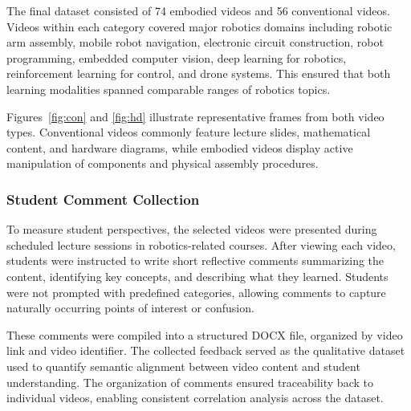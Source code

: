 The final dataset consisted of 74 embodied videos and 56 conventional videos. Videos within each category covered major robotics domains including robotic arm assembly, mobile robot navigation, electronic circuit construction, robot programming, embedded computer vision, deep learning for robotics, reinforcement learning for control, and drone systems. This ensured that both learning modalities spanned comparable ranges of robotics topics.

Figures~\ref{fig:con} and \ref{fig:hd} illustrate representative frames from both video types. Conventional videos commonly feature lecture slides, mathematical content, and hardware diagrams, while embodied videos display active manipulation of components and physical assembly procedures.

\subsubsection{Student Comment Collection}

To measure student perspectives, the selected videos were presented during scheduled lecture sessions in robotics-related courses. After viewing each video, students were instructed to write short reflective comments summarizing the content, identifying key concepts, and describing what they learned. Students were not prompted with predefined categories, allowing comments to capture naturally occurring points of interest or confusion.

These comments were compiled into a structured DOCX file, organized by video link and video identifier. The collected feedback served as the qualitative dataset used to quantify semantic alignment between video content and student understanding. The organization of comments ensured traceability back to individual videos, enabling consistent correlation analysis across the dataset.


